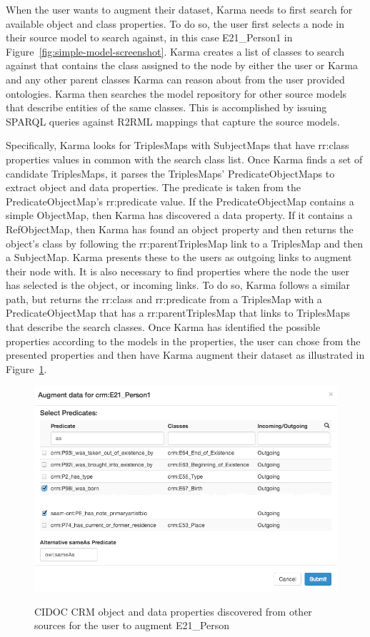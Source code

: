 When the user wants to augment their dataset, Karma needs to first search for available object and class properties.  
To do so, the user first selects a node in their source model to search against, in this case E21\_Person1 in Figure~\ref{fig:simple-model-screenshot}.
Karma creates a list of classes to search against that contains the class assigned to the node by either the user or Karma and any other parent classes Karma can reason about from the user provided ontologies.  
Karma then searches the model repository for other source models that describe entities of the same classes.  This is accomplished by issuing SPARQL queries against R2RML mappings that capture the source models.  

Specifically, Karma looks for TriplesMaps with SubjectMaps that have rr:class properties values in common with the search class list.  
Once Karma finds a set of candidate TriplesMaps, it parses the TriplesMaps' PredicateObjectMaps to extract object and data properties.  
The predicate is taken from the PredicateObjectMap's rr:predicate value.  
If the PredicateObjectMap contains a simple ObjectMap, then Karma has discovered a data property.  
If it contains a RefObjectMap, then Karma has found an object property and then returns the object's class by following the rr:parentTriplesMap link to a TriplesMap and then a SubjectMap.  
Karma presents these to the users as outgoing links to augment their node with.  
It is also necessary to find properties where the node the user has selected is the object, or incoming links.  
To do so, Karma follows a similar path, but returns the rr:class and rr:predicate from a TriplesMap with a PredicateObjectMap that has a rr:parentTriplesMap that links to TriplesMaps that describe the search classes. 
Once Karma has identified the possible properties according to the models in the properties, the user can chose from the presented properties and then have Karma augment their dataset as illustrated in Figure~\ref{fig:search-screenshot}.

\begin{figure}
\begin{center}
\includegraphics[width=4.9in]{images/5-search.png}
\vspace{-3mm}
\caption{CIDOC CRM object and data properties discovered from other sources for the user to augment E21\_Person}
\vspace{-2mm}
\label{fig:search-screenshot}
\end{center}
\vspace{-1.5em}
\end{figure}


